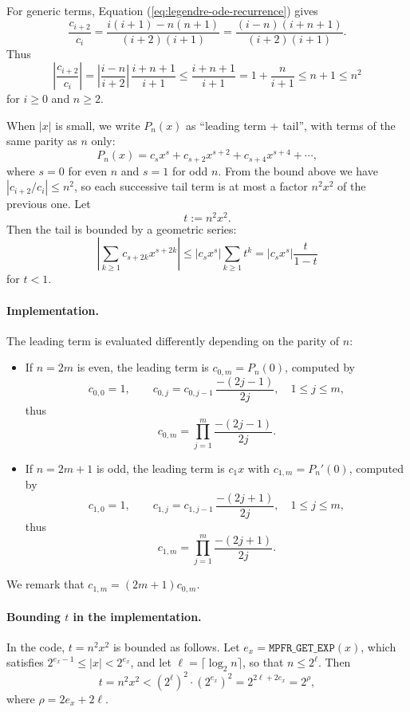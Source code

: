 \documentclass[12pt]{amsart}
\begin{document}
For generic terms, Equation (\ref{eq:legendre-ode-recurrence}) gives
\[
  \frac{c_{i+2}}{c_i} = \frac{i(i+1)-n(n+1)}{(i+2)(i+1)}
  = \frac{(i-n)(i+n+1)}{(i+2)(i+1)}.
\]
Thus
\[
  \left|\frac{c_{i+2}}{c_i}\right|
  = \left|\frac{i-n}{i+2}\right|\,\frac{i+n+1}{i+1}
  \leq \frac{i+n+1}{i+1}
  = 1 + \frac{n}{i+1}
  \leq n+1 \leq n^2
\]
for $i \geq 0$ and $n \geq 2$.

When $|x|$ is small, we write $P_n(x)$ as ``leading term + tail'', with terms
of the same parity as $n$ only:
\[
  P_n(x) = c_s x^s + c_{s+2}x^{s+2} + c_{s+4}x^{s+4} + \cdots,
\]
where $s=0$ for even $n$ and $s=1$ for odd $n$.
From the bound above we have $|c_{i+2}/c_i| \leq n^2$, so each successive tail
term is at most a factor $n^2 x^2$ of the previous one. Let
\[
  t := n^2 x^2.
\]
Then the tail is bounded by a geometric series:
\[
  \left|\sum_{k\geq 1} c_{s+2k}x^{s+2k}\right|
  \leq |c_s x^s|\sum_{k\geq 1} t^k
  = |c_s x^s|\frac{t}{1-t}
\]
for $t<1$.

\paragraph{\textbf{Implementation.}} The leading term is evaluated differently
depending on the parity of $n$:
\begin{itemize}
\item If $n=2m$ is even, the leading term is $c_{0,m} = P_n(0)$, computed by
  \[
    c_{0,0}=1, \qquad c_{0,j}=c_{0,j-1}\,\frac{-(2j-1)}{2j},
    \quad 1 \leq j \leq m,
  \]
  thus
  \[
    c_{0,m} = \prod_{j=1}^{m} \frac{-(2j-1)}{2j}.
  \]

\item If $n=2m+1$ is odd, the leading term is $c_1x$ with $c_{1,m}=P_n'(0)$,
  computed by
  \[
    c_{1,0}=1, \qquad c_{1,j}=c_{1,j-1}\,\frac{-(2j+1)}{2j},
    \quad 1 \leq j \leq m,
  \]
  thus
  \[
    c_{1,m} = \prod_{j=1}^{m} \frac{-(2j+1)}{2j}.
  \]
\end{itemize}
We remark that $c_{1,m} = (2m+1) c_{0,m}$.

\paragraph{\textbf{Bounding $t$ in the implementation.}}
In the code, $t = n^2 x^2$ is bounded as follows.
Let $e_x = \texttt{MPFR\_GET\_EXP}(x)$, which satisfies $2^{e_x-1} \le |x| < 2^{e_x}$,
and let $\ell = \lceil \log_2 n \rceil$, so that $n \le 2^\ell$.
Then
\[
  t = n^2 x^2 < \left(2^\ell\right)^2 \cdot \left(2^{e_x}\right)^2
              = 2^{2\ell + 2e_x} = 2^\rho,
\]
where $\rho = 2e_x + 2\ell$.
\end{document}
